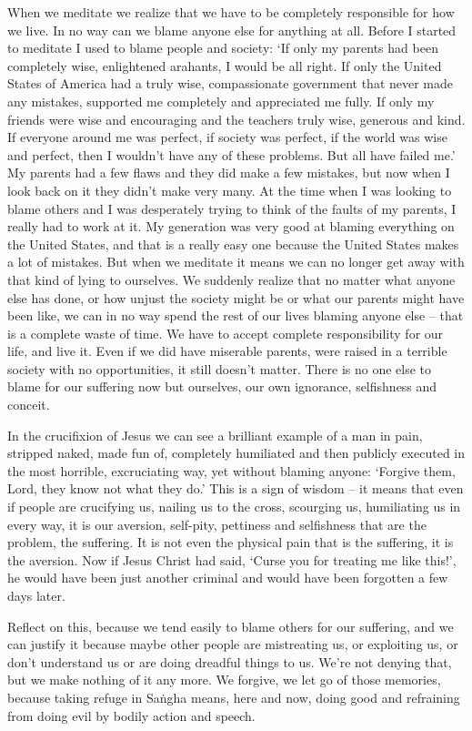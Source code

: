 When we meditate we realize that we have to be completely responsible for how we live. In no way can we blame anyone else for anything at all. Before I started to meditate I used to blame people and society: `If only my parents had been completely wise, enlightened arahants, I would be all right. If only the United States of America had a truly wise, compassionate government that never made any mistakes, supported me completely and appreciated me fully. If only my friends were wise and encouraging and the teachers truly wise, generous and kind. If everyone around me was perfect, if society was perfect, if the world was wise and perfect, then I wouldn't have any of these problems. But all have failed me.' My parents had a few flaws and they did make a few mistakes, but now when I look back on it they didn't make very many. At the time when I was looking to blame others and I was desperately trying to think of the faults of my parents, I really had to work at it. My generation was very good at blaming everything on the United States, and that is a really easy one because the United States makes a lot of mistakes.  But when we meditate it means we can no longer get away with that kind of lying to ourselves. We suddenly realize that no matter what anyone else has done, or how unjust the society might be or what our parents might have been like, we can in no way spend the rest of our lives blaming anyone else -- that is a complete waste of time. We have to accept complete responsibility for our life, and live it. Even if we did have miserable parents, were raised in a terrible society with no opportunities, it still doesn't matter. There is no one else to blame for our suffering now but ourselves, our own ignorance, selfishness and conceit.

In the crucifixion of Jesus we can see a brilliant example of a man in pain, stripped naked, made fun of, completely humiliated and then publicly executed in the most horrible, excruciating way, yet without blaming anyone: `Forgive them, Lord, they know not what they do.' This is a sign of wisdom -- it means that even if people are crucifying us, nailing us to the cross, scourging us, humiliating us in every way, it is our aversion, self-pity, pettiness and selfishness that are the problem, the suffering. It is not even the physical pain that is the suffering, it is the aversion. Now if Jesus Christ had said, `Curse you for treating me like this!', he would have been just another criminal and would have been forgotten a few days later.

Reflect on this, because we tend easily to blame others for our suffering, and we can justify it because maybe other people are mistreating us, or exploiting us, or don't understand us or are doing dreadful things to us. We're not denying that, but we make nothing of it any more. We forgive, we let go of those memories, because taking refuge in Sa\.ngha means, here and now, doing good and refraining from doing evil by bodily action and speech.

